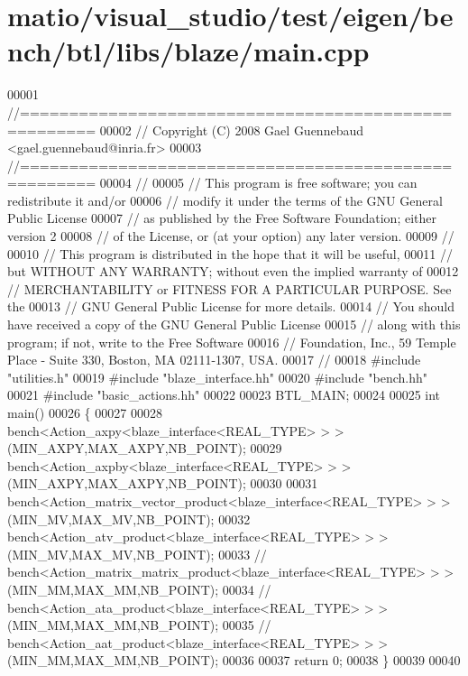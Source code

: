 \hypertarget{matio_2visual__studio_2test_2eigen_2bench_2btl_2libs_2blaze_2main_8cpp_source}{}\section{matio/visual\+\_\+studio/test/eigen/bench/btl/libs/blaze/main.cpp}
\label{matio_2visual__studio_2test_2eigen_2bench_2btl_2libs_2blaze_2main_8cpp_source}

\begin{DoxyCode}
00001 \textcolor{comment}{//=====================================================}
00002 \textcolor{comment}{// Copyright (C) 2008 Gael Guennebaud <gael.guennebaud@inria.fr>}
00003 \textcolor{comment}{//=====================================================}
00004 \textcolor{comment}{//}
00005 \textcolor{comment}{// This program is free software; you can redistribute it and/or}
00006 \textcolor{comment}{// modify it under the terms of the GNU General Public License}
00007 \textcolor{comment}{// as published by the Free Software Foundation; either version 2}
00008 \textcolor{comment}{// of the License, or (at your option) any later version.}
00009 \textcolor{comment}{//}
00010 \textcolor{comment}{// This program is distributed in the hope that it will be useful,}
00011 \textcolor{comment}{// but WITHOUT ANY WARRANTY; without even the implied warranty of}
00012 \textcolor{comment}{// MERCHANTABILITY or FITNESS FOR A PARTICULAR PURPOSE.  See the}
00013 \textcolor{comment}{// GNU General Public License for more details.}
00014 \textcolor{comment}{// You should have received a copy of the GNU General Public License}
00015 \textcolor{comment}{// along with this program; if not, write to the Free Software}
00016 \textcolor{comment}{// Foundation, Inc., 59 Temple Place - Suite 330, Boston, MA  02111-1307, USA.}
00017 \textcolor{comment}{//}
00018 \textcolor{preprocessor}{#include "utilities.h"}
00019 \textcolor{preprocessor}{#include "blaze\_interface.hh"}
00020 \textcolor{preprocessor}{#include "bench.hh"}
00021 \textcolor{preprocessor}{#include "basic\_actions.hh"}
00022 
00023 BTL\_MAIN;
00024 
00025 \textcolor{keywordtype}{int} main()
00026 \{
00027 
00028   bench<Action\_axpy<blaze\_interface<REAL\_TYPE> > >(MIN\_AXPY,MAX\_AXPY,NB\_POINT);
00029   bench<Action\_axpby<blaze\_interface<REAL\_TYPE> > >(MIN\_AXPY,MAX\_AXPY,NB\_POINT);
00030 
00031   bench<Action\_matrix\_vector\_product<blaze\_interface<REAL\_TYPE> > >(MIN\_MV,MAX\_MV,NB\_POINT);
00032   bench<Action\_atv\_product<blaze\_interface<REAL\_TYPE> > >(MIN\_MV,MAX\_MV,NB\_POINT);
00033 \textcolor{comment}{//   bench<Action\_matrix\_matrix\_product<blaze\_interface<REAL\_TYPE> > >(MIN\_MM,MAX\_MM,NB\_POINT);}
00034 \textcolor{comment}{//   bench<Action\_ata\_product<blaze\_interface<REAL\_TYPE> > >(MIN\_MM,MAX\_MM,NB\_POINT);}
00035 \textcolor{comment}{//   bench<Action\_aat\_product<blaze\_interface<REAL\_TYPE> > >(MIN\_MM,MAX\_MM,NB\_POINT);}
00036 
00037   \textcolor{keywordflow}{return} 0;
00038 \}
00039 
00040 
\end{DoxyCode}
